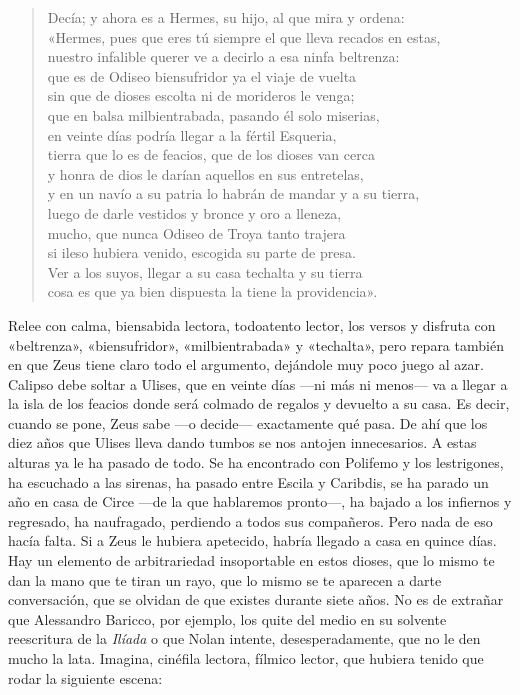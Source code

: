 \documentclass[11pt,a4paper]{article}
\begin{document}
\begin{verse}
Decía; y ahora es a Hermes, su hijo, al que mira y ordena:\\
«Hermes, pues que eres tú siempre el que lleva recados en estas,\\
nuestro infalible querer ve a decirlo a esa ninfa beltrenza:\\
que es de Odiseo biensufridor ya el viaje de vuelta\\
sin que de dioses escolta ni de morideros le venga;\\
que en balsa milbientrabada, pasando él solo miserias,\\
en veinte días podría llegar a la fértil Esqueria,\\
tierra que lo es de feacios, que de los dioses van cerca\\
y honra de dios le darían aquellos en sus entretelas,\\
y en un navío a su patria lo habrán de mandar y a su tierra,\\
luego de darle vestidos y bronce y oro a lleneza,\\
mucho, que nunca Odiseo de Troya tanto trajera\\
si ileso hubiera venido, escogida su parte de presa.\\
Ver a los suyos, llegar a su casa techalta y su tierra\\
cosa es que ya bien dispuesta la tiene la providencia».
\end{verse}

Relee con calma, biensabida lectora, todoatento lector, los versos y disfruta con «beltrenza», «biensufridor», «milbientrabada» y «techalta», pero repara también en que Zeus tiene claro todo el argumento, dejándole muy poco juego al azar. Calipso debe soltar a Ulises, que en veinte días ---ni más ni menos--- va a llegar a la isla de los feacios donde será colmado de regalos y devuelto a su casa. Es decir, cuando se pone, Zeus sabe ---o decide--- exactamente qué pasa. De ahí que los diez años que Ulises lleva dando tumbos se nos antojen innecesarios. A estas alturas ya le ha pasado de todo. Se ha encontrado con Polifemo y los lestrigones, ha escuchado a las sirenas, ha pasado entre Escila y Caribdis, se ha parado un año en casa de Circe ---de la que hablaremos pronto---, ha bajado a los infiernos y regresado, ha naufragado, perdiendo a todos sus compañeros. Pero nada de eso hacía falta. Si a Zeus le hubiera apetecido, habría llegado a casa en quince días. Hay un elemento de arbitrariedad insoportable en estos dioses, que lo mismo te dan la mano que te tiran un rayo, que lo mismo se te aparecen a darte conversación, que se olvidan de que existes durante siete años. No es de extrañar que Alessandro Baricco, por ejemplo, los quite del medio en su solvente reescritura de la \emph{Ilíada} o que Nolan intente, desesperadamente, que no le den mucho la lata. Imagina, cinéfila lectora, fílmico lector, que hubiera tenido que rodar la siguiente escena:
\end{document}

